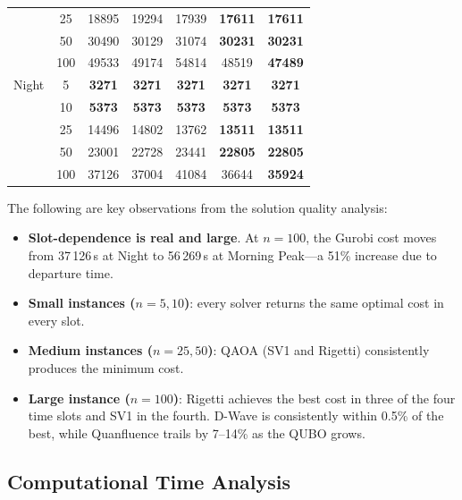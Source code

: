\documentclass[conference]{IEEEtran}
\begin{document}
\begin{table}[htbp]
\begin{center}
\begin{tabular}{|l|c|c|c|c|c|c|}
             & 25  & 18895          & 19294          & 17939          & \textbf{17611} & \textbf{17611} \\
             & 50  & 30490          & 30129          & 31074          & \textbf{30231} & \textbf{30231} \\
             & 100 & 49533          & 49174          & 54814          & 48519          & \textbf{47489} \\
\hline
Night        & 5   & \textbf{3271}  & \textbf{3271}  & \textbf{3271}  & \textbf{3271}  & \textbf{3271}  \\
             & 10  & \textbf{5373}  & \textbf{5373}  & \textbf{5373}  & \textbf{5373}  & \textbf{5373}  \\
             & 25  & 14496          & 14802          & 13762          & \textbf{13511} & \textbf{13511} \\
             & 50  & 23001          & 22728          & 23441          & \textbf{22805} & \textbf{22805} \\
             & 100 & 37126          & 37004          & 41084          & 36644          & \textbf{35924} \\
\hline
\end{tabular}
\label{tab:results_quality}
\end{center}
\end{table}

The following are key observations from the solution quality analysis:

\begin{itemize}
\item \textbf{Slot-dependence is real and large}. At $n=100$, the Gurobi cost moves from 37\,126\,s at Night to 56\,269\,s at Morning Peak---a 51\% increase due to departure time.
\item \textbf{Small instances ($n=5,10$)}: every solver returns the same optimal cost in every slot. 
\item \textbf{Medium instances ($n=25,50$)}: QAOA (SV1 and Rigetti) consistently produces the minimum cost. 
\item \textbf{Large instance ($n=100$)}: Rigetti achieves the best cost in three of the four time slots and SV1 in the fourth. D-Wave is consistently within 0.5\% of the best, while Quanfluence trails by 7--14\% as the QUBO grows.
\end{itemize}

\subsection{Computational Time Analysis}
\end{document}
